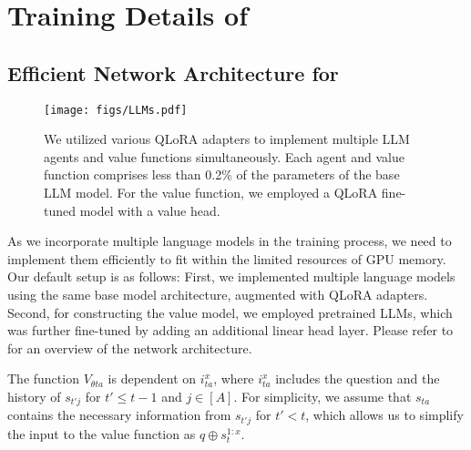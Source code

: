 
\section{Training Details of \ours} \label{appendix:training}

\subsection{Efficient Network Architecture for \ours}
\begin{figure}[!h]
    \centering
    \texttt{[image: figs/LLMs.pdf]}
\caption{We utilized various QLoRA adapters to implement multiple LLM agents and value functions simultaneously. Each agent and value function comprises less than 0.2\% of the parameters of the base LLM model. For the value function, we employed a QLoRA fine-tuned model with a value head.}
    \label{fig:LoRA}
\end{figure}

As we incorporate multiple language models in the training process, we need to implement them efficiently to fit within the limited resources of GPU memory. Our default setup is as follows: First, we implemented multiple language models using the same base model architecture, augmented with QLoRA adapters. Second, for constructing the value model, we employed pretrained LLMs, which was further fine-tuned by adding an additional linear head layer. Please refer to  for an overview of the network architecture.

\begin{remark}
    The function \( V_{\theta ta} \) is dependent on \( i_{ta}^x \), where \( i_{ta}^x \) includes the question and the history of \( s_{t'j} \) for \( t' \leq t-1 \) and \( j \in [A] \). For simplicity, we assume that \( s_{ta} \) contains the necessary information from \( s_{t'j} \) for \( t' < t \), which allows us to simplify the input to the value function as \( q \oplus s_{t}^{1:x} \).
\end{remark}


